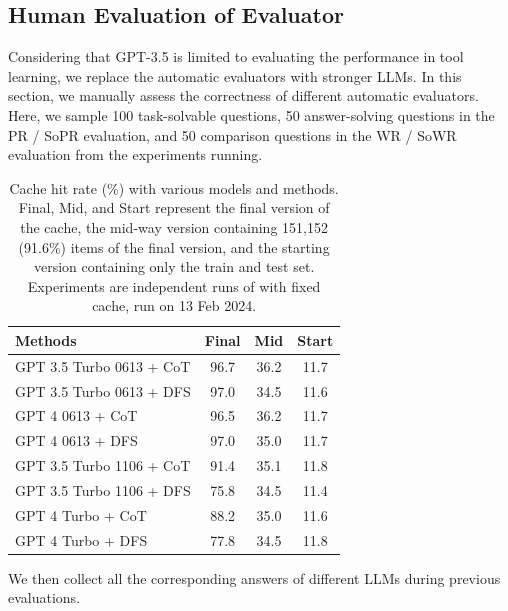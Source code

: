 \subsection{Human Evaluation of Evaluator}
\label{sec:evaluator}

Considering that GPT-3.5 is limited to evaluating the performance in tool learning, we replace the automatic evaluators with stronger LLMs.
In this section, we manually assess the correctness of different automatic evaluators. 
Here, we sample 100 task-solvable questions, 50 answer-solving questions in the PR / SoPR evaluation, and 50 comparison questions in the WR / SoWR evaluation from the experiments running.

\begin{table}
    \centering
    \small
    \begin{tabular}{lccc}
        \toprule
        \textbf{Methods} & \textbf{Final} & \textbf{Mid} & \textbf{Start}\\
        \midrule
        GPT 3.5 Turbo 0613 + CoT & 96.7 & 36.2 & 11.7 \\
        GPT 3.5 Turbo 0613 + DFS & 97.0 & 34.5 & 11.6 \\
        GPT 4 0613 + CoT &  96.5 & 36.2 & 11.7\\
        GPT 4 0613  + DFS & 97.0 & 35.0 & 11.7 \\
         \midrule 
        GPT 3.5 Turbo 1106 + CoT & 91.4 & 35.1 & 11.8\\
         GPT 3.5 Turbo 1106 + DFS & 75.8 & 34.5 & 11.4 \\
        GPT 4 Turbo + CoT & 88.2 & 35.0 & 11.6 \\
        GPT 4 Turbo + DFS & 77.8 & 34.5 & 11.8\\
        \bottomrule
    \end{tabular}
    \caption{Cache hit rate (\%) with various models and methods. Final, Mid, and Start represent the final version of the cache, the mid-way version containing 151,152 (91.6\%) items of the final version, and the starting version containing only the train and test set. Experiments are independent runs of  with fixed cache, run on 13 Feb 2024.}
    \label{tab:cache_hit}
\end{table}
We then collect all the corresponding answers of different LLMs during previous evaluations.

